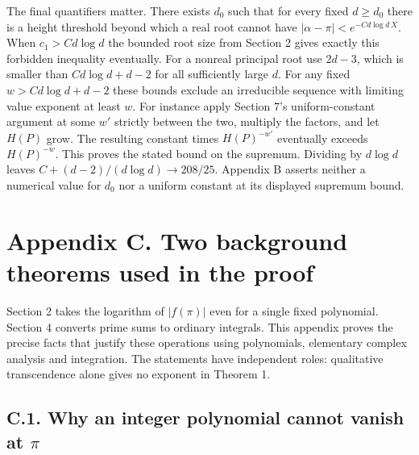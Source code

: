 \documentclass[11pt,a4paper]{article}
\begin{document}
The final quantifiers matter. There exists \(d_0\) such that for every fixed \(d\ge d_0\) there is a height threshold beyond which a real root cannot have \(|\alpha-\pi|<e^{-Cd\log d\,X}\). When \(c_1>Cd\log d\) the bounded root size from Section 2 gives exactly this forbidden inequality eventually. For a nonreal principal root use \(2d-3\), which is smaller than \(Cd\log d+d-2\) for all sufficiently large \(d\). For any fixed \(w>Cd\log d+d-2\) these bounds exclude an irreducible sequence with limiting value exponent at least \(w\). For instance apply Section 7's uniform-constant argument at some \(w'\) strictly between the two, multiply the factors, and let \(H(P)\) grow. The resulting constant times \(H(P)^{-w'}\) eventually exceeds \(H(P)^{-w}\). This proves the stated bound on the supremum. Dividing by \(d\log d\) leaves \(C+(d-2)/(d\log d)\to208/25\). Appendix B asserts neither a numerical value for \(d_0\) nor a uniform constant at its displayed supremum bound.

\section{Appendix C. Two background theorems used in the proof}\label{appendix-c.-two-background-theorems-used-in-the-proof}

Section 2 takes the logarithm of \(|f(\pi)|\) even for a single fixed polynomial. Section 4 converts prime sums to ordinary integrals. This appendix proves the precise facts that justify these operations using polynomials, elementary complex analysis and integration. The statements have independent roles: qualitative transcendence alone gives no exponent in Theorem 1.

\subsection{\texorpdfstring{C.1. Why an integer polynomial cannot vanish at \(\pi\)}{C.1. Why an integer polynomial cannot vanish at π}}\label{c.1.-why-an-integer-polynomial-cannot-vanish-at-pi}
\end{document}
